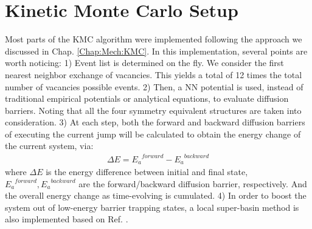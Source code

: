 \newpage
\section{Kinetic Monte Carlo Setup}
\label{Chap:Al/Vac:section:KMC}

Most parts of the \ac{KMC} algorithm were implemented following the approach we discussed in Chap. \ref{Chap:Mech:KMC}. In this implementation, several points are worth noticing: 1) Event list is determined on the fly. We consider the first nearest neighbor exchange of vacancies. This yields a total of 12 times the total number of vacancies possible events. 2) Then, a \ac{NN} potential is used, instead of traditional empirical potentials or analytical equations, to evaluate diffusion barriers. Noting that all the four symmetry equivalent structures are taken into consideration. 3) At each step, both the forward and backward diffusion barriers of executing the current jump will be calculated to obtain the energy change of the current system, via:
\begin{align}
\Delta E = {E_a}^{forward} - {E_a}^{backward}
\label{Chap:Al/Vac:eq:barrier-EDiff}
\end{align}
where $\Delta E$ is the energy difference between initial and final state, ${E_a}^{forward}, {E_a}^{backward}$ are the forward/backward diffusion barrier, respectively. And the overall energy change as time-evolving is cumulated. 4) In order to boost the system out of low-energy barrier trapping states, a local super-basin method is also implemented based on Ref. \cite{fichthorn2013local}.


